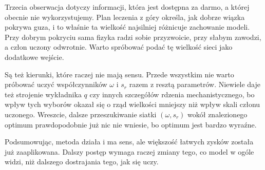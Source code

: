 \documentclass[11pt,a4paper]{article}
\begin{document}
Trzecia obserwacja dotyczy informacji, która jest dostępna za darmo, a której obecnie nie
wykorzystujemy. Plan leczenia z góry określa, jak dobrze wiązka pokrywa guza, i to właśnie
ta wielkość najsilniej różnicuje zachowanie modeli. Przy dobrym pokryciu sama fizyka radzi
sobie przyzwoicie, przy słabym zawodzi, a człon uczony odwrotnie. Warto spróbować podać tę
wielkość sieci jako dodatkowe wejście.

Są też kierunki, które raczej nie mają sensu. Przede wszystkim nie warto próbować uczyć
współczynników $\omega$ i $s_r$ razem z resztą parametrów.
Niewiele daje też strojenie wykładnika $q$ czy innych szczegółów rdzenia mechanistycznego,
bo wpływ tych wyborów okazał się o rząd wielkości mniejszy niż wpływ skali członu uczonego.
Wreszcie, dalsze przeszukiwanie siatki $(\omega, s_r)$ wokół znalezionego optimum
prawdopodobnie już nic nie wniesie, bo optimum jest bardzo wyraźne.

Podsumowując, metoda działa i ma sens, ale większość łatwych zysków została już
zaaplikowana. Dalszy postęp wymaga raczej zmiany tego, co model w ogóle widzi, niż
dalszego dostrajania tego, jak się uczy.
\end{document}
